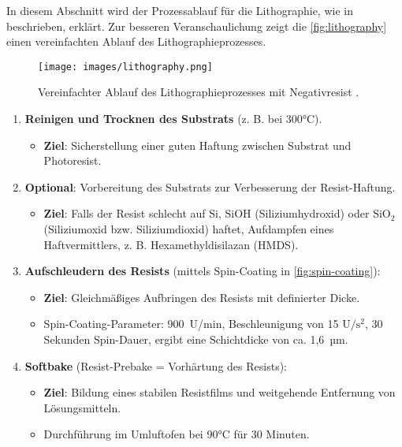 \documentclass{article} %
\begin{document}
In diesem Abschnitt wird der Prozessablauf für die Lithographie, wie in \cite{schmid2024, gerald2006} beschrieben, erklärt. Zur besseren Veranschaulichung zeigt die \autoref{fig:lithography} einen vereinfachten Ablauf des Lithographieprozesses.

\begin{figure}[htb!]
    \centering
    \texttt{[image: images/lithography.png]} %
    \captionsetup{labelfont=bf, width=\textwidth} %
    \caption{Vereinfachter Ablauf des Lithographieprozesses mit Negativresist \cite{wias_photoresist}.}
    \label{fig:lithography}
\end{figure}

\begin{enumerate}
    \item \textbf{Reinigen und Trocknen des Substrats} (z. B. bei 300°C).
    \begin{itemize}
        \item \textbf{Ziel}: Sicherstellung einer guten Haftung zwischen Substrat und Photoresist.
    \end{itemize}

    \item \textbf{Optional}: Vorbereitung des Substrats zur Verbesserung der Resist-Haftung.
    \begin{itemize}
        \item \textbf{Ziel}: Falls der Resist schlecht auf $\mathrm{Si}$, $\mathrm{SiOH}$ (Siliziumhydroxid) oder $\mathrm{SiO}_2$ (Siliziumoxid bzw. Siliziumdioxid) haftet, Aufdampfen eines Haftvermittlers, z. B. Hexamethyldisilazan (HMDS).
    \end{itemize}

    \item \textbf{Aufschleudern des Resists} (mittels Spin-Coating in \autoref{fig:spin-coating}):
    \begin{itemize}
        \item \textbf{Ziel}: Gleichmäßiges Aufbringen des Resists mit definierter Dicke.
        \item Spin-Coating-Parameter: 900~U/min, Beschleunigung von 15 $\mathrm{U}/\mathrm{s}^2$, 30 Sekunden Spin-Dauer, ergibt eine Schichtdicke von ca. 1,6~µm.
    \end{itemize}

    \item \textbf{Softbake} (Resist-Prebake = Vorhärtung des Resists):
    \begin{itemize}
        \item \textbf{Ziel}: Bildung eines stabilen Resistfilms und weitgehende Entfernung von Lösungsmitteln.
        \item Durchführung im Umluftofen bei 90°C für 30 Minuten.
    \end{itemize}


\end{enumerate}
\end{document}
